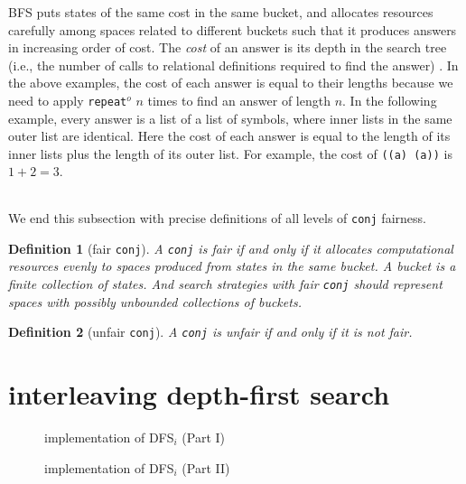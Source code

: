 \documentclass[format=acmlarge, review=true, authordraft=true]{acmart}
\newcommand{\conj}{\texttt{conj}}
\newcommand{\repeato}{\texttt{repeat$^o$}}
\newcommand{\DFSi }[0]{DFS$_{i}$}
\newcommand{\BFS}[0]{BFS}
\newtheorem{defn}{Definition}[section]
\begin{document}
\BFS{} puts states of the same cost in the same bucket, and allocates
resources carefully among spaces related to different buckets such
that it produces answers in increasing order of cost. The \emph{cost}
of an answer is its depth in the search tree (i.e., the number of
calls to relational definitions required to find the answer) 
\citep{seres1999algebra}. In the above examples, the cost of each answer is 
equal to their lengths because we need to apply \repeato{} $n$ times to find an 
answer of length $n$. In the following example, every answer is a list of a 
list of symbols, where inner lists in the same outer list are identical. Here 
the cost of each answer is equal to the length of its inner lists plus the 
length of its outer list. For example, the cost of \texttt{((a) (a))} is $1 + 2 
= 3$.

\begin{center}
	\begin{tabular}{c}
		
	\end{tabular}
\end{center}

We end this subsection with precise definitions of all levels of \conj{} 
fairness.

\begin{defn}[fair \conj{}]
A \conj{} is fair if and only if it allocates computational resources evenly to 
spaces produced from states in the same bucket. A bucket is a finite 
collection of states. And search strategies with fair \conj{} should represent 
spaces with possibly unbounded collections of buckets. 
\end{defn}

\begin{defn}[unfair \conj{}]
A \conj{} is unfair if and only if it is not fair.
\end{defn}





\section{interleaving depth-first search}

\begin{figure}
	
	\caption{implementation of \DFSi{} (Part I)}
	\label{DFSi-0}
\end{figure}

\begin{figure}
	
	\caption{implementation of \DFSi{} (Part II)}
	\label{DFSi-1}
\end{figure}
\end{document}

